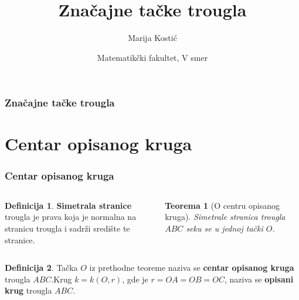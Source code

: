 \documentclass{beamer}
\title{\bf Zna\v{c}ajne ta\v{c}ke trougla}
\author{Marija Kosti\'{c}}
\date{Matematik\v{c}ki fakultet, V smer}
\newtheorem{teorema}{{Teorema}}[section]
\theoremstyle{definition}
\newtheorem{definicija}{{Definicija}}
\begin{document}
\frame{\titlepage}

\begin{frame}
\frametitle{\bf Zna\v{c}ajne ta\v{c}ke trougla}
\tableofcontents
\end{frame}

\section{Centar opisanog kruga}

\begin{frame}
\frametitle{\bf Centar opisanog kruga}
		\begin{columns}[t]
			\pause
			\begin{definicija}
			\alert{\bf Simetrala stranice} trougla je prava koja je normalna na stranicu trougla i sadr\v{z}i sredi\v{s}te te stranice.
			\end{definicija}
			
			\pause
			\begin{teorema}[O centru opisanog kruga]
			Simetrale stranica trougla $ABC$ seku se u jednoj ta\v{c}ki $O$.
			\end{teorema}
			
			\begin{center}
				\resizebox{2in}{!}{}
			\end{center}
		\end{columns}
		
		\pause 
		\begin{definicija} Ta\v{c}ka $O$ iz prethodne teoreme naziva se \alert{\bf centar opisanog kruga} trougla $ABC$.\pause Krug $k=k(O,r)$, gde je $r = OA = OB = OC$, naziva se \alert{\bf opisani krug} trougla $ABC$.
		\end{definicija}
		
\end{frame}
\end{document}
